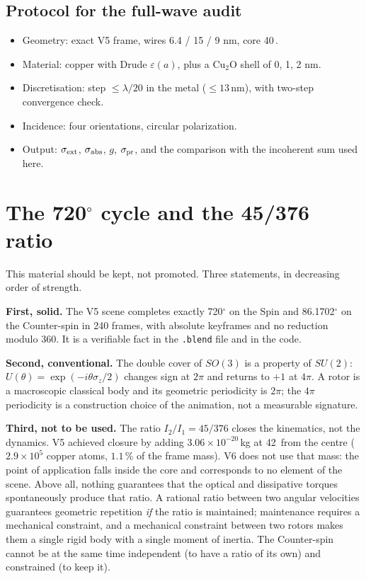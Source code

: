 \documentclass[11pt,a4paper]{article}
\providecommand{\SI}[2]{#1\,\text{#2}}
\begin{document}
\subsection{Protocol for the full-wave audit}
\begin{itemize}\itemsep1pt
\item Geometry: exact V5 frame, wires 6.4 / 15 / 9 nm, core \SI{40}{nm}.
\item Material: copper with Drude $\varepsilon(a)$, plus a Cu$_2$O shell of 0, 1, 2 nm.
\item Discretisation: step $\le\lambda/20$ in the metal ($\le\SI{13}{nm}$), with
two-step convergence check.
\item Incidence: four orientations, circular polarization.
\item Output: $\sigma_{\rm ext}$, $\sigma_{\rm abs}$, $g$, $\sigma_{\rm pr}$, and the
comparison with the incoherent sum used here.
\end{itemize}

\appendix
\section{The 720$^\circ$ cycle and the 45/376 ratio}
\label{app:su2}

This material should be kept, not promoted. Three statements, in decreasing order of
strength.

\textbf{First, solid.} The V5 scene completes exactly 720$^\circ$ on the Spin and
86.1702$^\circ$ on the Counter-spin in 240 frames, with absolute keyframes and no
reduction modulo 360. It is a verifiable fact in the \texttt{.blend} file and in the
code.

\textbf{Second, conventional.} The double cover of $SO(3)$ is a property of $SU(2)$:
$U(\theta)=\exp(-i\theta\sigma_z/2)$ changes sign at $2\pi$ and returns to $+1$ at
$4\pi$. A rotor is a macroscopic classical body and its geometric periodicity is
$2\pi$; the $4\pi$ periodicity is a construction choice of the animation, not a
measurable signature.

\textbf{Third, not to be used.} The ratio $I_2/I_1=45/376$ closes the kinematics, not
the dynamics. V5 achieved closure by adding $3.06\times10^{-20}$\,kg at \SI{42}{nm}
from the centre ($2.9\times10^5$ copper atoms, $1.1$\,\% of the frame mass). V6 does not
use that mass: the point of application falls inside the core and corresponds to no
element of the scene. Above all, nothing guarantees that the optical and dissipative
torques spontaneously produce that ratio. A rational ratio between two angular
velocities guarantees geometric repetition \emph{if} the ratio is maintained;
maintenance requires a mechanical constraint, and a mechanical constraint between two
rotors makes them a single rigid body with a single moment of inertia. The
Counter-spin cannot be at the same time independent (to have a ratio of its own) and
constrained (to keep it).
\end{document}

